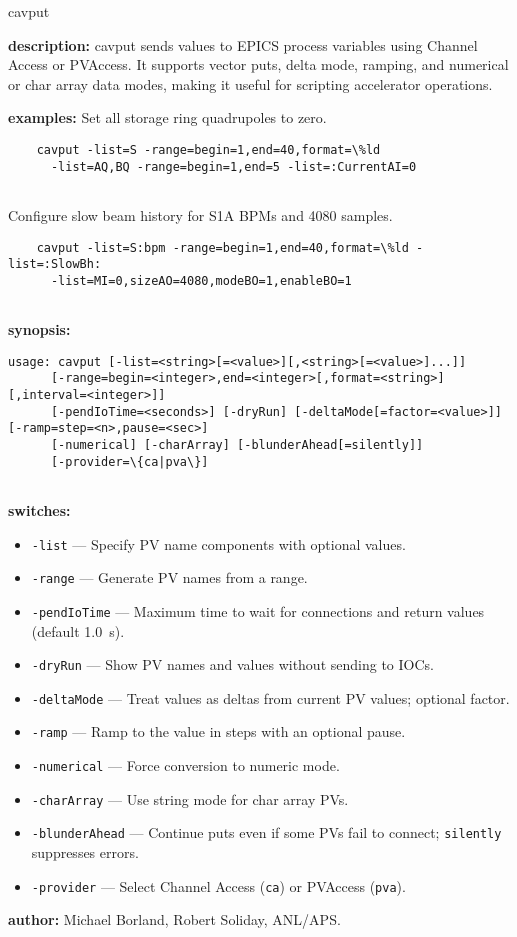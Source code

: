\begin{sddsprog}{cavput}
\item \textbf{description:}
    cavput sends values to EPICS process variables using Channel Access or PVAccess. It supports vector puts, delta mode, ramping, and numerical or char array data modes, making it useful for scripting accelerator operations.
\item \textbf{examples:}
    Set all storage ring quadrupoles to zero.
    \begin{verbatim}
    cavput -list=S -range=begin=1,end=40,format=\%ld
      -list=AQ,BQ -range=begin=1,end=5 -list=:CurrentAI=0
    
\end{verbatim}
    Configure slow beam history for S1A BPMs and 4080 samples.
    \begin{verbatim}
    cavput -list=S:bpm -range=begin=1,end=40,format=\%ld -list=:SlowBh:
      -list=MI=0,sizeAO=4080,modeBO=1,enableBO=1
    
\end{verbatim}
\item \textbf{synopsis:}
    \begin{verbatim}
usage: cavput [-list=<string>[=<value>][,<string>[=<value>]...]]
      [-range=begin=<integer>,end=<integer>[,format=<string>][,interval=<integer>]]
      [-pendIoTime=<seconds>] [-dryRun] [-deltaMode[=factor=<value>]] [-ramp=step=<n>,pause=<sec>]
      [-numerical] [-charArray] [-blunderAhead[=silently]]
      [-provider=\{ca|pva\}]
    
\end{verbatim}
\item \textbf{switches:}
\begin{itemize}
  \item {\tt -list} --- Specify PV name components with optional values.
  \item {\tt -range} --- Generate PV names from a range.
  \item {\tt -pendIoTime} --- Maximum time to wait for connections and return values (default 1.0~s).
  \item {\tt -dryRun} --- Show PV names and values without sending to IOCs.
  \item {\tt -deltaMode} --- Treat values as deltas from current PV values; optional factor.
  \item {\tt -ramp} --- Ramp to the value in steps with an optional pause.
  \item {\tt -numerical} --- Force conversion to numeric mode.
  \item {\tt -charArray} --- Use string mode for char array PVs.
  \item {\tt -blunderAhead} --- Continue puts even if some PVs fail to connect; \verb|silently| suppresses errors.
  \item {\tt -provider} --- Select Channel Access ({\tt ca}) or PVAccess ({\tt pva}).
\end{itemize}
\item \textbf{author:} Michael Borland, Robert Soliday, ANL/APS.
\end{sddsprog}
